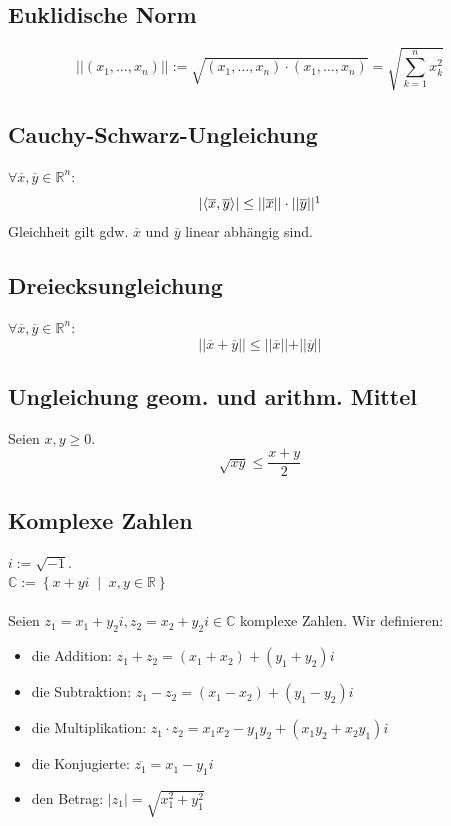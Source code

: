 \documentclass[halfparscip]{scrartcl}
\newcounter{subsection2}
\begin{document}
\subsection*{Euklidische Norm}
\begin{equation*}
\vert\vert (x_1, \dots, x_n) \vert\vert := \sqrt{(x_1, \dots, x_n)\cdot(x_1, \dots, x_n)} = \sqrt{\sum_{k=1}^{n}x^2_k}
\end{equation*}

\subsection{Cauchy-Schwarz-Ungleichung}
$\forall \overline{x},\overline{y}\in\mathbb{R}^n$:
\begin{equation*}
	\left\vert\left<\overline{x},\overline{y}\right>\right\vert \leq \vert\vert\overline{x}\vert\vert \cdot \vert\vert\overline{y}\vert\vert\footnotemark
\end{equation*}
Gleichheit gilt gdw. $\overline{x}$ und $\overline{y}$ linear abhängig sind.

\subsection{Dreiecksungleichung}
$\forall \overline{x},\overline{y}\in\mathbb{R}^n$:
\begin{equation*}
	\vert\vert \overline{x} + \overline{y} \vert\vert \leq \vert\vert\overline{x}\vert\vert + \vert\vert\overline{y}\vert\vert
\end{equation*}

\subsection{Ungleichung geom. und arithm. Mittel}
Seien $x,y \geq 0$.
\begin{equation*}
	\sqrt{xy} \leq \frac{x + y}{2}
\end{equation*}

\subsection*{Komplexe Zahlen}
$i := \sqrt{-1}$.\\
$\mathbb{C} := \left\{x + yi \;\middle|\; x, y \in \mathbb{R}\right\}$\\\\
Seien $z_1 = x_1 + y_2i, z_2 = x_2 + y_2i \in \mathbb{C}$ komplexe Zahlen. Wir definieren:
\begin{itemize}
	\item die Addition: $z_1 + z_2 = (x_1 + x_2) + (y_1 + y_2)i$
	\item die Subtraktion: $z_1 - z_2 = (x_1 - x_2) + (y_1 - y_2)i$
	\item die Multiplikation: $z_1 \cdot z_2 = x_1x_2 - y_1y_2 + (x_1y_2 + x_2y_1)i$
	\item die Konjugierte: $\overline{z_1} = x_1 - y_1i$
	\item den Betrag: $\vert z_1\vert = \sqrt{x_1^2 + y_1^2}$
\end{itemize}
\end{document}
